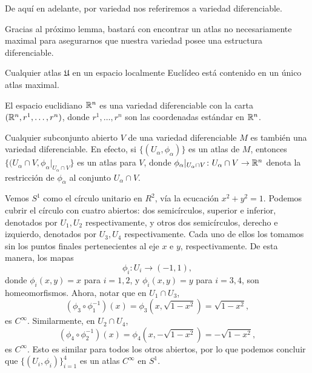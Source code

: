 De aquí en adelante, por variedad nos referiremos a variedad diferenciable. \par

Gracias al próximo lemma, bastará con encontrar un atlas no necesariamente maximal para asegurarnos que nuestra variedad posee una estructura diferenciable.

\begin{lemma}
	Cualquier atlas $\mathfrak{U}$ en un espacio localmente Euclídeo está contenido en un único atlas maximal.
\end{lemma}

\begin{example}
	El espacio euclidiano $\mathbb{R}^{n}$ es una variedad diferenciable con la carta $(\mathbb{R}^{n}, r^{1},\dots,r^{n})$, donde $r^{1},\dots,r^{n}$ son las coordenadas estándar en $\mathbb{R}^{n}$.
\end{example}

\begin{example}
	Cualquier subconjunto abierto $V$ de una variedad diferenciable $M$ es también una variedad diferenciable. En efecto, si $\{ (U_{\alpha},\phi_{\alpha}) \}$ es un atlas de $M$, entonces $\{ (U_{\alpha} \cap V, \phi_{\alpha}|_{U_{\alpha} \cap V} \}$ es un atlas para $V$, donde $\phi_{\alpha}|_{U_{\alpha} \cap V} \colon U_{\alpha} \cap V \to \mathbb{R}^{n}$ denota la restricción de $\phi_{\alpha}$ al conjunto $U_{\alpha} \cap V$.
\end{example}

\begin{example}
	Vemos $S^{1}$ como el círculo unitario en $R^{2}$, vía la ecucación $x^{2} + y^{2} = 1$. Podemos cubrir el círculo con cuatro abiertos: dos semicírculos, superior e inferior, denotados por $U_{1},U_{2}$ respectivamente, y otros dos semicírculos, derecho e izquierdo, denotados por $U_{3},U_{4}$ respectivamente. Cada uno de ellos los tomamos sin los puntos finales pertenecientes al eje $x$ e $y$, respectivamente. De esta manera, los mapas
	\[ \phi_{i} \colon U_{i} \to (-1,1), \]
	donde $\phi_{i}(x,y) = x$ para $i=1,2$, y $\phi_{i}(x,y) = y$ para $i=3,4$, son homeomorfismos.
	Ahora, notar que en $U_{1} \cap U_{3}$,
	\[ (\phi_{3} \circ \phi_{1}^{-1})(x) = \phi_{3}\left(x, \sqrt{1 - x^{2}}\right) = \sqrt{1 - x^{2}}, \]
	es $C^{\infty}$. Similarmente, en $U_{2} \cap U_{4}$,
	\[ (\phi_{4} \circ \phi_{2}^{-1})(x) = \phi_{4}\left(x, -\sqrt{1-x^{2}}\right) = -\sqrt{1-x^{2}}, \]
	es $C^{\infty}$. Esto es similar para todos los otros abiertos, por lo que podemos concluir que $\{ (U_{i}, \phi_{i}) \}_{i=1}^{4}$ es un atlas $C^{\infty}$ en $S^{1}$.
\end{example}

